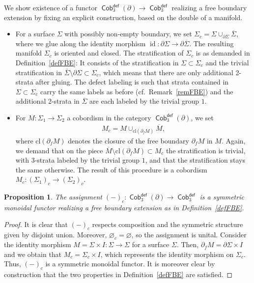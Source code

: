 \documentclass[10pt,a4paper]{amsart}
\DeclareMathOperator{\id}{id}
\DeclareMathOperator{\Cob}{\mathsf{Cob}}
\numberwithin{equation}{section}
\newtheorem{Proposition}[Proposition]{Proposition}
\theoremstyle{definition}
\begin{document}
We show existence of a functor $\Cob_3^{\mathsf{def}}(\partial) \rightarrow \Cob_3^{\mathsf{def}}$ realizing a free boundary extension by fixing an explicit construction, based on the double of a manifold.
\begin{itemize}\itemsep=0pt
 \item For a surface $\Sigma$ with possibly non-empty boundary, we set $\Sigma_c = \Sigma \cup_{\partial \Sigma} \overline{\Sigma}$, where we glue along the identity morphism $\id\colon \partial \Sigma \rightarrow \partial \overline{\Sigma}$. The resulting manifold $\Sigma_c$ is oriented and closed. The stratification of $\Sigma_c$ is as demanded in Definition~\ref{defFBE}: It consists of the stratification in $\Sigma \subset \Sigma_c$ and the trivial stratification in $\overline{\Sigma}\setminus \partial \Sigma \subset \Sigma_c$, which means that there are only additional 2-strata after gluing. The defect labeling is such that strata contained in $\Sigma \subset \Sigma_c$ carry the same labels as before (cf.\ Remark~\ref{remFBE}) and the additional 2-strata in $\overline{\Sigma}$ are each labeled by the trivial group $1$.
 \item For $M\colon \Sigma_1 \rightarrow \Sigma_2$ a cobordism in the category $\Cob_3^{\mathsf{def}}(\partial)$, we set
 \begin{align*}
 M_c = M \cup_{\mathrm{cl}(\partial_fM)} \overline{M},
 \end{align*}
 where $\mathrm{cl}(\partial_fM)$ denotes the closure of the free boundary $\partial_fM$ in $M$. Again, we demand that on the piece $\overline{M} \setminus \mathrm{cl}(\partial_f M) \subset M_c$ the stratification is trivial, with 3-strata labeled by the trivial group $1$, and that the stratification stays the same otherwise. The result of this procedure is a cobordism $M_c\colon \left(\Sigma_1\right)_c \rightarrow \left(\Sigma_2\right)_c$.
\end{itemize}

\begin{Proposition} \label{propCobF}
 The assignment $(-)_c\colon \Cob_3^{\mathsf{def}}(\partial) \rightarrow \Cob_3^{\mathsf{def}}$ is a symmetric monoidal functor realizing a free boundary extension as in Definition~{\rm \ref{defFBE}}.
\end{Proposition}
\begin{proof}
It is clear that $(-)_c$ respects composition and the symmetric structure given by disjoint union. Moreover, $\varnothing_c = \varnothing$, so the assignment is unital. Consider the identity morphism $M = \Sigma \times I\colon \Sigma \rightarrow \Sigma$ for a surface $\Sigma$. Then, $\partial_fM = \partial \Sigma \times I$ and we obtain that $M_c = \Sigma_c \times I$, which represents the identity morphism on $\Sigma_c$. Thus, $(-)_c$ is a symmetric monoidal functor. It is moreover clear by construction that the two properties in Definition~\ref{defFBE} are satisfied.
\end{proof}
\end{document}
